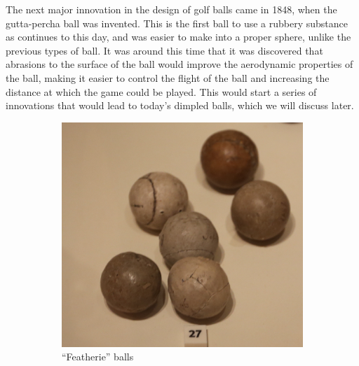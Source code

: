 The next major innovation in the design of golf balls came in 1848, when the gutta-percha
ball was invented. This is the first ball to use a rubbery substance as continues to this day,
and was easier to make into a proper sphere, unlike the previous types of ball. It was around
this time that it was discovered that abrasions to the surface of the ball would improve the
aerodynamic properties of the ball, making it easier to control the flight of the ball and increasing
the distance at which the game could be played. This would start a series of innovations that
would lead to today’s dimpled balls, which we will discuss later.

\begin{figure}[h]
\centering
\begin{subfigure}[b]{0.4\textwidth}
\includegraphics[scale=0.16]{../images/featherie.jpg}
\caption{``Featherie'' balls}
\label{im:featherie}
\end{subfigure}
\quad \quad \quad \quad
\begin{subfigure}[b]{0.4\textwidth}

\end{subfigure}
\end{figure}
